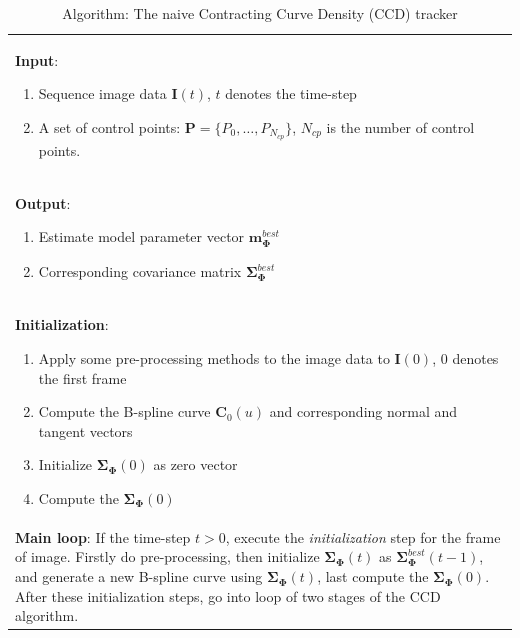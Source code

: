 \begin{table}[htbp]
  \caption{Algorithm: The naive Contracting Curve Density (CCD) tracker}
  \label{summary of CCD}
  \centering
  \begin{tabular*}{0.9\textwidth}{!{\color{red} \vrule width 4pt}l}
\textbf{Input}:\parbox{13cm}{ 
  \begin{enumerate}
  \item Sequence image data $\mathbf{I}(t)$, $t$ denotes the time-step
  \item A set of control points:  $\mathbf{P} = \{P_{0}, \ldots, P_{N_{cp}}\}$,
$N_{cp}$ is the number of control points.
  \end{enumerate}
}
\\
\textbf{Output}: 
\parbox{13cm}{
  \begin{enumerate}
  \item Estimate model parameter vector $\mathbf{m}_{\mathbf{\Phi}}^{best}$ 
  \item Corresponding covariance matrix $\mathbf{\Sigma}_{\mathbf{\Phi}}^{best}$
  \end{enumerate}
}
\\
\textbf{Initialization}:\parbox{13cm}
{
  \begin{enumerate}
  \item Apply some pre-processing methods to the image data to
    $\mathbf{I}(0)$, $0$ denotes the first frame
  \item Compute the B-spline curve $\mathbf{C}_{0}(u)$ and
    corresponding normal and tangent vectors 
  \item Initialize $\mathbf{\Sigma}_{\mathbf{\Phi}}(0)$ as zero vector
  \item Compute the $\mathbf{\Sigma}_{\mathbf{\Phi}}(0)$
  \end{enumerate}
}\\
\textbf{Main loop}: 
\parbox{13cm}
{
If the time-step $t > 0$, execute the \textit{initialization} step for
the frame of image. Firstly do pre-processing, then initialize $\mathbf{\Sigma}_{\mathbf{\Phi}}(t)$ as
$\mathbf{\Sigma}_{\mathbf{\Phi}}^{best}(t-1)$, and generate a new
B-spline curve using $\mathbf{\Sigma}_{\mathbf{\Phi}}(t)$,
last compute the $\mathbf{\Sigma}_{\mathbf{\Phi}}(0)$. After these
initialization steps, go into loop of  two stages of the CCD algorithm.
}\\


\end{tabular*}
\end{table}
